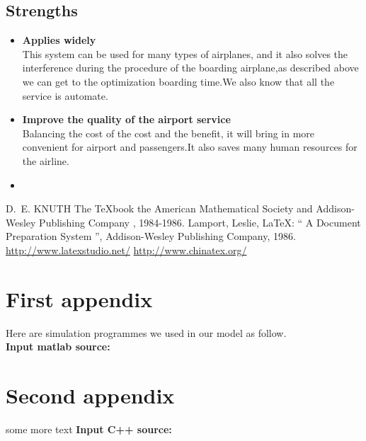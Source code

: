 \documentclass{mcmthesis}
\begin{document}
\subsection{Strengths}
\begin{itemize}
\item \textbf{Applies widely}\\
This  system can be used for many types of airplanes, and it also
solves the interference during  the procedure of the boarding
airplane,as described above we can get to the  optimization
boarding time.We also know that all the service is automate.
\item \textbf{Improve the quality of the airport service}\\
Balancing the cost of the cost and the benefit, it will bring in
more convenient  for airport and passengers.It also saves many
human resources for the airline. 
\item \textbf{}
\end{itemize}

\begin{thebibliography}{99}
 D.~E. KNUTH   The \TeX{}book  the American
Mathematical Society and Addison-Wesley
Publishing Company , 1984-1986.
Lamport, Leslie,  \LaTeX{}: `` A Document Preparation System '',
Addison-Wesley Publishing Company, 1986.
\url{http://www.latexstudio.net/}
\url{http://www.chinatex.org/}
\end{thebibliography}

\begin{appendices}

\section{First appendix}



Here are simulation programmes we used in our model as follow.\\

\textbf{\textcolor[rgb]{0.98,0.00,0.00}{Input matlab source:}}


\section{Second appendix}

some more text \textcolor[rgb]{0.98,0.00,0.00}{\textbf{Input C++ source:}}


\end{appendices}
\end{document}
